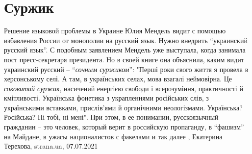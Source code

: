  
 
 
 
 
\chapter{Суржик}
\label{sec:slova.surzhik}

Решение языковой проблемы в Украине Юлия Мендель видит с помощью избавления
России от монополии на русский язык. Нужно внедрить \enquote{украинский русский
язык}.  С подобным заявлением Мендель уже выступала, когда занимала пост
пресс-секретаря президента. Но в своей книге она объяснила, каким видит
украинский русский – \enquote{\emph{сочным суржиком}}: "Перші роки свого життя
я провела в херсонському селі. А там, в українських селах, мова взагалі
неймовірна. Це \emph{соковитий суржик}, насичений енергією свободи і
всерозуміння, практичності й кмітливості. Українська фонетика з украпленнями
російських слів, з українськими вставками, прислів’ями й органічними
неологізмами. Українська? Російська? Ні тобі, ні мені".  При этом, в ее
понимании, русскоязычный гражданин – это человек, который верит в российскую
пропаганду, в \enquote{фашизм} на Майдане, в ужасы националистов с факелами и
так далее
, 
Екатерина Терехова, strana.ua, 07.07.2021
